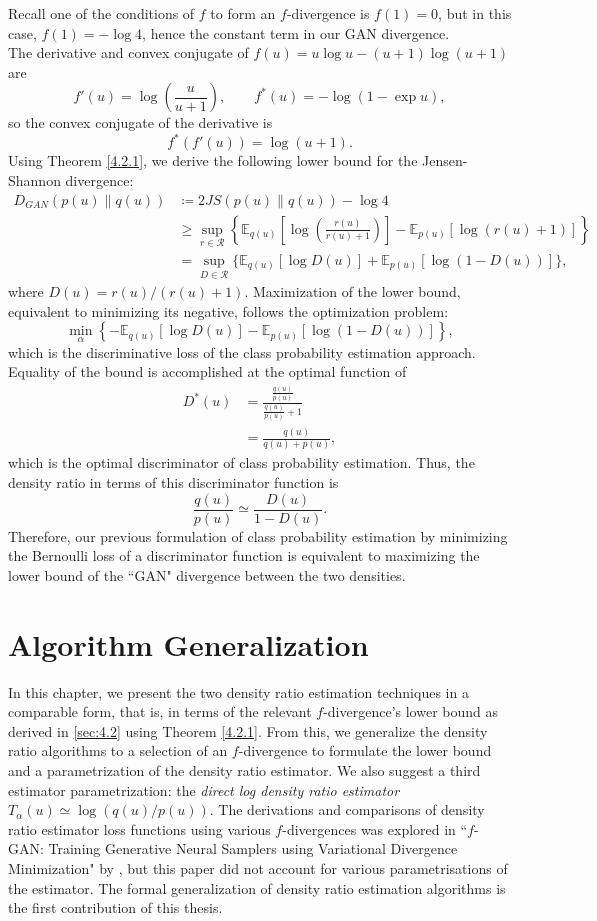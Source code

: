 \documentclass[honours,12pt, twoside]{unswthesis}
\newcommand{\E}{\mathbb{E}}
\numberwithin{equation}{section}
\theoremstyle{definition}
\begin{document}
Recall one of the conditions of $f$ to form an $f$-divergence is $f(1)=0$, but in this case, $f(1)=-\log 4$, hence the constant term in our GAN divergence.\\
The derivative and convex conjugate of $f(u)=u\log u-(u+1)\log (u+1)$ are
\[f'(u)=\log \left(\frac{u}{u+1}\right),\qquad f^*(u)=-\log (1-\exp u),\]
so the convex conjugate of the derivative is
\[f^*(f'(u))=\log (u+1).\]
Using Theorem \ref{4.2.1}, we derive the following lower bound for the Jensen-Shannon divergence:
\begin{align*}
D_{GAN}(p(u)\|q(u))&\coloneqq 2JS(p(u)\|q(u))-\log 4\\
&\geq \sup_{r\in \mathcal{R}}\left\lbrace\mathbb{E}_{q(u)}\left[\log \left(\frac{r(u)}{r(u)+1}\right)\right]-\mathbb{E}_{p(u)}[\log(r(u)+1)]\right\rbrace\\
&=\sup_{D\in \mathcal{R}}\{\E_{q(u)}[\log D(u)]+\E_{p(u)}[\log(1-D(u))]\},
\end{align*}
where $D(u)=r(u)/(r(u)+1)$. Maximization of the lower bound, equivalent to minimizing its negative, follows the optimization problem:
\[\min_\alpha \left\lbrace-\E_{q(u)}[\log D(u)]-\E_{p(u)}[\log (1-D(u))]\right\rbrace,\]
which is the discriminative loss of the class probability estimation approach. Equality of the bound is accomplished at the optimal function of
\begin{align*}
D^*(u)&=\frac{\frac{q(u)}{p(u)}}{\frac{q(u)}{p(u)}+1}\\
&=\frac{q(u)}{q(u)+p(u)},
\end{align*}
which is the optimal discriminator of class probability estimation. Thus, the density ratio in terms of this discriminator function is 
\[\frac{q(u)}{p(u)}\simeq \frac{D(u)}{1-D(u)}.\]
Therefore, our previous formulation of class probability estimation by minimizing the Bernoulli loss of a discriminator function is equivalent to maximizing the lower bound of the ``GAN" divergence between the two densities.
\chapter{Algorithm Generalization}\label{ch5}
In this chapter, we present the two density ratio estimation techniques in a comparable form, that is, in terms of the relevant $f$-divergence's lower bound as derived in \autoref{sec:4.2} using Theorem \ref{4.2.1}. From this, we generalize the density ratio algorithms to a selection of an $f$-divergence to formulate the lower bound and a parametrization of the density ratio estimator. We also suggest a third estimator parametrization: the \textit{direct log density ratio estimator} $T_\alpha(u)\simeq \log (q(u)/p(u))$. The derivations and comparisons of density ratio estimator loss functions using various $f$-divergences was explored in ``$f$-GAN: Training Generative Neural Samplers using Variational Divergence Minimization" by \citet{nowozin}, but this paper did not account for various parametrisations of the estimator. The formal generalization of density ratio estimation algorithms is the first contribution of this thesis.
\end{document}
